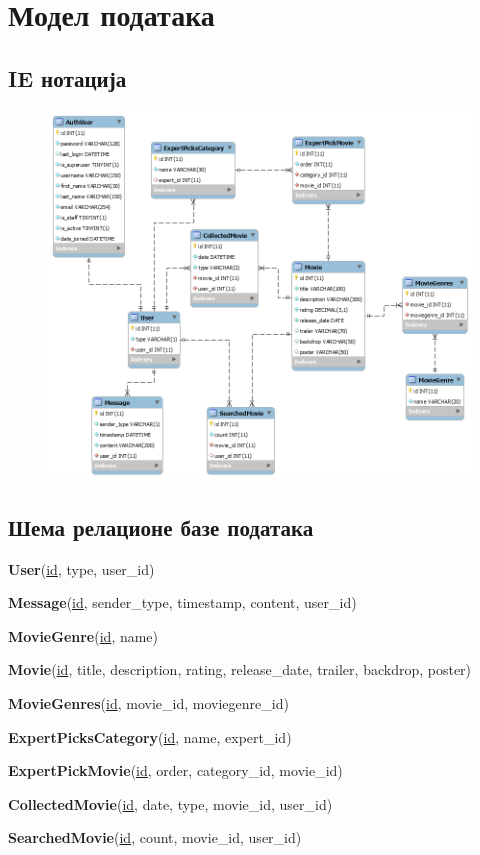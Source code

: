 \newpage
\section{Модел података}

\subsection{IE нотација}

\begin{figure}[h]
  \includegraphics[width=\linewidth]{model.png}
\end{figure}

\subsection{Шема релационе базе података}

\textbf{User}(\underline{id}, type, user\_id)
\vspace{0.2cm}

\textbf{Message}(\underline{id}, sender\_type, timestamp, content, user\_id)
\vspace{0.2cm}

\textbf{MovieGenre}(\underline{id}, name)
\vspace{0.2cm}

\textbf{Movie}(\underline{id}, title, description, rating, release\_date, trailer, backdrop, poster)
\vspace{0.2cm}

\textbf{MovieGenres}(\underline{id}, movie\_id, moviegenre\_id)
\vspace{0.2cm}

\textbf{ExpertPicksCategory}(\underline{id}, name, expert\_id)
\vspace{0.2cm}

\textbf{ExpertPickMovie}(\underline{id}, order, category\_id, movie\_id)
\vspace{0.2cm}

\textbf{CollectedMovie}(\underline{id}, date, type, movie\_id, user\_id)
\vspace{0.2cm}

\textbf{SearchedMovie}(\underline{id}, count, movie\_id, user\_id)
